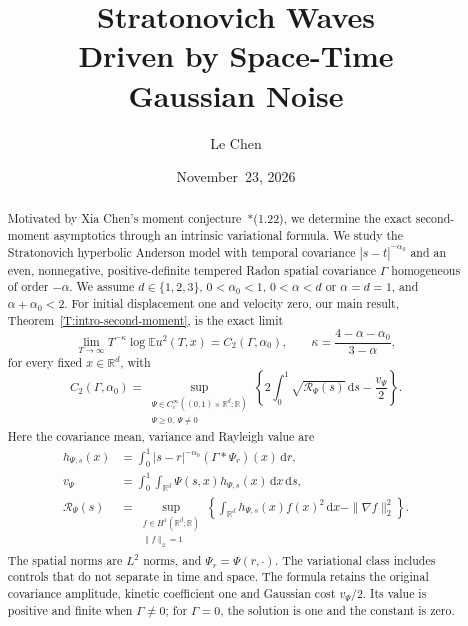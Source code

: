 \documentclass[12pt,oneside,openany]{book}
\numberwithin{equation}{section}
\theoremstyle{nogostyle}
\theoremstyle{definition}
\newcommand{\R}{\mathbb{R}}
\newcommand{\E}{\mathbb{E}}
\newcommand{\ud}{\,\mathrm{d}}
\begin{document}
\frontmatter
\hypersetup{pageanchor=false}

\title{Stratonovich Waves\\
Driven by Space-Time\\
Gaussian Noise}
\author{Le Chen}
\date{November~23, 2026}
\maketitle
\clearpage

\hypersetup{pageanchor=true}



\begin{abstract}
  Motivated by Xia Chen's moment
  conjecture~\cite{chen:author2026:time-dependency}*{(1.22)}, we determine the
  exact second-moment asymptotics through an intrinsic variational formula.
  We study the Stratonovich hyperbolic Anderson model with temporal covariance
  $|s-t|^{-\alpha_0}$ and an even, nonnegative, positive-definite tempered
  Radon spatial covariance $\Gamma$ homogeneous of order $-\alpha$. We assume
  $d\in\{1,2,3\}$, $0<\alpha_0<1$, $0<\alpha<d$ or $\alpha=d=1$, and
  $\alpha+\alpha_0<2$. For initial displacement one and velocity zero, our
  main result, Theorem~\ref{T:intro-second-moment}, is the exact limit
  \[
    \lim_{T\to\infty}T^{-\kappa}\log\E u^2(T,x)
    =C_2(\Gamma,\alpha_0),
    \qquad \kappa=\frac{4-\alpha-\alpha_0}{3-\alpha},
  \]
  for every fixed $x\in\R^d$, with
  \[
    C_2(\Gamma,\alpha_0)
    =\sup_{\substack{\Psi\in C_c^\infty((0,1)\times\R^d;\R)\\
    \Psi\ge0,\ \Psi\ne0}}
    \left\{2\int_0^1\sqrt{\mathcal{R}_\Psi(s)}\ud s
    -\frac{v_\Psi}{2}\right\}.
  \]
  Here the covariance mean, variance and Rayleigh value are
  \[
    \begin{aligned}
      h_{\Psi,s}(x)
      &=\int_0^1|s-r|^{-\alpha_0}(\Gamma*\Psi_r)(x)\ud r,\\
      v_\Psi&=\int_0^1\int_{\R^d}\Psi(s,x)h_{\Psi,s}(x)\ud x\ud s,\\
      \mathcal{R}_\Psi(s)
      &=\sup_{\substack{f\in H^1(\R^d;\R)\\\|f\|_2=1}}
      \left\{\int_{\R^d}h_{\Psi,s}(x)f(x)^2\ud x
      -\|\nabla f\|_2^2\right\}.
    \end{aligned}
  \]
  The spatial norms are $L^2$ norms, and $\Psi_r=\Psi(r,\cdot)$. The
  variational class includes controls that do not separate in time and space.
  The formula retains the original covariance amplitude, kinetic coefficient
  one and Gaussian cost $v_\Psi/2$. Its value is positive and finite when
  $\Gamma\ne0$; for $\Gamma=0$, the solution is one and the constant is zero.


\end{abstract}
\end{document}
